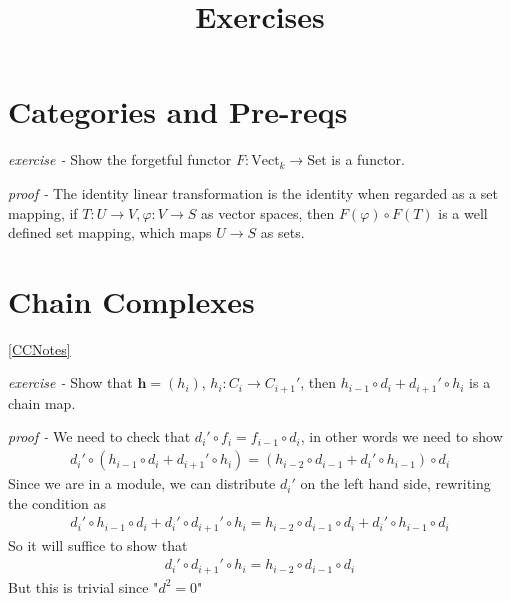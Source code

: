 \documentclass[11pt]{article}
\title{Exercises}
\theoremstyle{definition}
\begin{document}
\maketitle

\section{Categories and Pre-reqs}

\emph{exercise - }\label{PreEx1} Show the forgetful functor \(F: \text{Vect}_k \to \text{Set}\) is a functor.

\emph{proof - } The identity linear transformation is the identity when regarded as a set mapping, if \(T: U \to V, \varphi: V \to S\) as vector spaces, then \(F(\varphi)\circ F(T)\) is a well defined set mapping, which maps \(U \to S\) as sets.


\section{Chain Complexes}\label{CCEx} \ref{CCNotes}

\emph{exercise - }\label{CCEx1} Show that \(\mathbf{h} = (h_i)\), \(h_i: C_i \to C_{i+1}'\), then \(h_{i-1}\circ d_i + d_{i+1}' \circ h_i\) is a chain map.

\emph{proof - } We need to check that \(d_i' \circ f_i = f_{i-1} \circ d_i\), in other words we need to show
\begin{align*}
    d_i' \circ (h_{i-1}\circ d_i + d_{i+1}' \circ h_i) = (h_{i-2}\circ d_{i-1} + d_{i}' \circ h_{i-1})\circ d_i
\end{align*}
Since we are in a module, we can distribute \(d_i'\) on the left hand side, rewriting the condition as
\begin{align*}
    d_i' \circ h_{i-1}\circ d_i + d_i' \circ d_{i+1}' \circ h_i = h_{i-2}\circ d_{i-1}\circ d_i + d_{i}' \circ h_{i-1}\circ d_i
\end{align*}
So it will suffice to show that
\begin{align*}
    d_i' \circ d_{i+1}' \circ h_i = h_{i-2}\circ d_{i-1}\circ d_i
\end{align*}
But this is trivial since "\(d^2 = 0\)"
\end{document}
